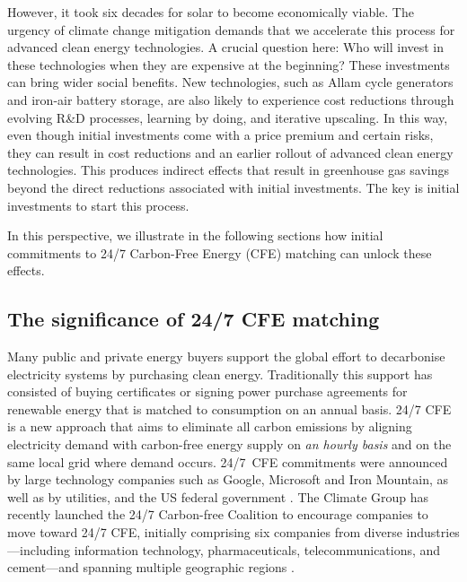 \documentclass[pdflatex,sn-basic, Numbered]{sn-jnl}
\theoremstyle{thmstyleone}%
\theoremstyle{thmstyletwo}%
\theoremstyle{thmstylethree}%
\begin{document}
However, it took six decades for solar to become economically viable. The urgency of climate change mitigation demands that we accelerate this process for advanced clean energy technologies. A crucial question here: Who will invest in these technologies when they are expensive at the beginning? These investments can bring wider social benefits. New technologies, such as Allam cycle generators and iron-air battery storage, are also likely to experience cost reductions through evolving R\&D processes, learning by doing, and iterative upscaling. In this way, even though initial investments come with a price premium and certain risks, they can result in cost reductions and an earlier rollout of advanced clean energy technologies. This produces indirect effects that result in greenhouse gas savings beyond the direct reductions associated with initial investments. The key is initial investments to start this process.

In this perspective, we illustrate in the following sections how initial commitments to 24/7 Carbon-Free Energy (CFE) matching can unlock these effects.

\subsection*{The significance of 24/7 CFE matching}\label{sec2}

Many public and private energy buyers support the global effort to decarbonise electricity systems by purchasing clean energy.
Traditionally this support has consisted of buying certificates or signing power purchase agreements for renewable energy that is matched to consumption on an annual basis. 24/7 CFE is a new approach that aims to eliminate all carbon emissions by aligning electricity demand with carbon-free energy supply on \textit{an hourly basis} and on the same local grid where demand occurs.
24/7~CFE commitments were announced by large technology companies such as Google, Microsoft and Iron Mountain, as well as by utilities, and the US federal government \cite{gocarbonfree247}. The Climate Group has recently launched the 24/7 Carbon-free Coalition to encourage companies to move toward 24/7 CFE, initially comprising six companies from diverse industries---including information technology, pharmaceuticals, telecommunications, and cement---and spanning multiple geographic regions \cite{climategroup247CarbonFree2024}.
\end{document}
